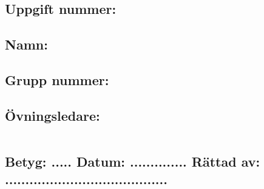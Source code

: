 \thispagestyle{empty}
\section*{\course \coursename}

\vspace{10mm}

\subsection*{Uppgift nummer: \assignmentnr}

\vspace{3mm}

\subsection*{Namn: \theauthor}

\vspace{3mm}

\subsection*{Grupp nummer: \groupnr}

\vspace{3mm}

\subsection*{Övningsledare: \courseleader}


\vspace{10mm}

\begin{tabular}{l}
 \hspace{140mm} \\
\hline \hline
\end{tabular}

\vspace{5mm}

\subsection*{Betyg: ..... \hspace{2mm}  Datum: .............. \hspace{2mm} Rättad av: ........................................}
